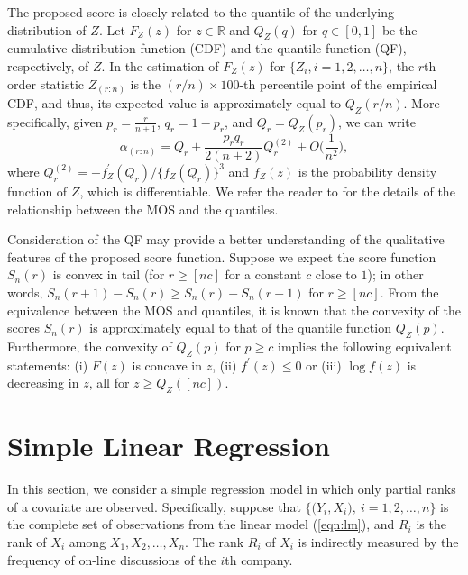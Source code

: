 \documentclass[12pt]{article}
\begin{document}
 
The proposed score is closely related to the quantile of the underlying distribution of $Z$. Let 
$F_{Z} (z)$ for $z \in \mathbb{R}$ and $Q_Z(q)$ for $q \in [0,1]$ be 
the cumulative distribution function (CDF) and the quantile function (QF), respectively, of $Z$. 
In the estimation of $F_Z(z)$ for $\{Z_i, i=1,2,\ldots,n\}$, 
the $r$th-order statistic $Z_{(r:n)}$ is the $(r/n)\times 100$-th percentile point of the empirical CDF, 
and thus, its expected value is approximately equal to $Q_Z(r/n)$. More specifically, given $p_r=\frac{r}
{n+1}$, $q_r=1-p_r$, and $Q_r=Q_Z(p_r)$, we can write 
\begin{equation} \nonumber 
\alpha_{(r:n)}=Q_r+ \frac{p_r q_r}{2(n+2)} Q_r^{(2)}+O\big(\frac{1}{n^2} \big),
\end{equation}
where $Q_r^{(2)}=-{f_Z^{\prime} (Q_r)} \big/{\{ f_Z (Q_r) \}^3}$ and $f_Z(z)$ is the probability density 
function of $Z$, which is differentiable. We refer the reader to \citet[Section 4.6]{David:2003} 
for the details of the relationship between the MOS and the quantiles. 


Consideration of the QF may provide a better understanding of the qualitative features of the proposed score 
function. Suppose we expect the score function $S_n(r)$ is convex in tail 
(for $r \ge [n c]$ for a constant $c$ close to $1$); in other words, 
$S_n (r+1) - S_n (r) \ge S_n(r) - S_n (r-1)$ for $r \ge [n c]$. 
From the equivalence between the MOS and quantiles,
it is known that the convexity of the scores $S_n(r)$ is approximately equal to that 
of the quantile function $Q_Z(p)$. Furthermore, 
the convexity of $Q_Z(p)$ for $p \ge c$  implies the following 
equivalent statements: (i) 
$F(z)$ is concave in $z$, (ii) $f^{\prime} (z) \le 0$ or (iii) $\log f (z)$ is decreasing in $z$, all for $z \ge Q_Z([nc])$.


\section{Simple Linear Regression}


In this section, we consider a simple regression model in which only partial ranks of a covariate are observed. Specifically, suppose that $\big\{ \big( Y_{i}, X_{i} \big), ~i=1,2,\ldots,n \big\}$ is the complete set of observations
from the linear model (\ref{eqn:lm}),
and $R_i$ is the rank of $X_i$ among $X_1,X_2,\ldots,X_n$. The rank $R_i$ 
of $X_i$ is indirectly measured by the frequency of on-line discussions of the $i$th company.
\end{document}
